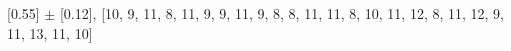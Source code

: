 
[0.55] $\pm$ [0.12], [10, 9, 11, 8, 11, 9, 9, 11, 9, 8, 8, 11, 11, 8, 10, 11, 12, 8, 11, 12, 9, 11, 13, 11, 10]\\
